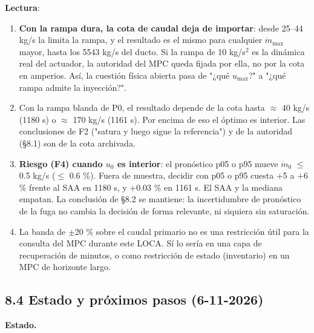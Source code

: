\documentclass[11pt,a4paper]{article}
\begin{document}
\textbf{Lectura}:

\begin{enumerate}
\item \textbf{Con la rampa dura, la cota de caudal deja de importar}: desde 25–44 kg/s la limita la rampa, y el resultado es el mismo para cualquier $\dot m_{\max}$ mayor, hasta los 5543 kg/s del ducto. Si la rampa de 10 kg/s$^{2}$ es la dinámica real del actuador, la autoridad del MPC queda fijada por ella, no por la cota en amperios. Así, la cuestión física abierta pasa de "¿qué $u_{\max}$?" a "¿qué rampa admite la inyección?".
\item Con la rampa blanda de P0, el resultado depende de la cota hasta $\approx$ 40 kg/s (1180 s) o $\approx$ 170 kg/s (1161 s). Por encima de eso el óptimo es interior. Las conclusiones de F2 ("satura y luego sigue la referencia") y de la autoridad (\S{}8.1) son de la cota archivada.
\item \textbf{Riesgo (F4) cuando $u_0$ es interior}: el pronóstico p05 o p95 mueve $\dot m_0$ $\le$ 0.5 kg/s ($\le$ 0.6 \%). Fuera de muestra, decidir con p05 o p95 cuesta +5 a +6 \% frente al SAA en 1180 s, y +0.03 \% en 1161 s. El SAA y la mediana empatan. La conclusión de \S{}8.2 se mantiene: la incertidumbre de pronóstico de la fuga no cambia la decisión de forma relevante, ni siquiera sin saturación.
\item La banda de $\pm$20 \% sobre el caudal primario no es una restricción útil para la consulta del MPC durante este LOCA. Sí lo sería en una capa de recuperación de minutos, o como restricción de estado (inventario) en un MPC de horizonte largo.
\end{enumerate}

\subsection*{8.4 Estado y próximos pasos (6-11-2026)}
\textbf{Estado.}
\end{document}
